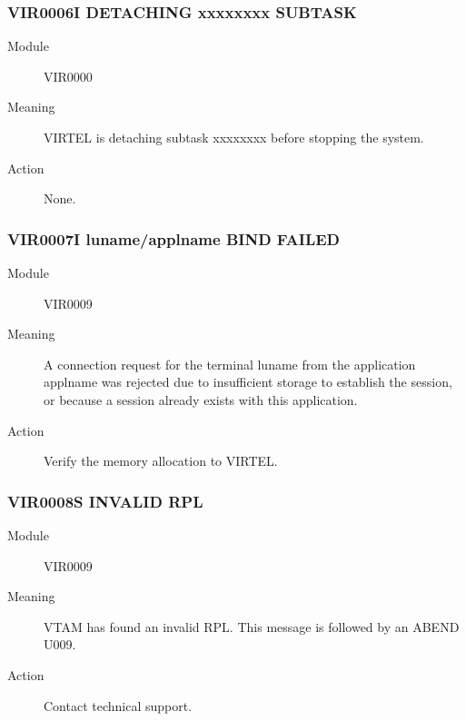 \documentclass[letterpaper,10pt,english]{sphinxmanual}
\begin{document}
\subsubsection{VIR0006I DETACHING xxxxxxxx SUBTASK}
\label{\detokenize{messages:vir0006i-detaching-xxxxxxxx-subtask}}\begin{description}
\item[{Module}] \leavevmode
VIR0000

\item[{Meaning}] \leavevmode
VIRTEL is detaching subtask xxxxxxxx before stopping the system.

\item[{Action}] \leavevmode
None.

\end{description}


\subsubsection{VIR0007I luname/applname BIND FAILED}
\label{\detokenize{messages:vir0007i-luname-applname-bind-failed}}\begin{description}
\item[{Module}] \leavevmode
VIR0009

\item[{Meaning}] \leavevmode
A connection request for the terminal luname from the application applname was rejected due to insufficient storage to establish the session, or because a session already exists with this application.

\item[{Action}] \leavevmode
Verify the memory allocation to VIRTEL.

\end{description}


\subsubsection{VIR0008S INVALID RPL}
\label{\detokenize{messages:vir0008s-invalid-rpl}}\begin{description}
\item[{Module}] \leavevmode
VIR0009

\item[{Meaning}] \leavevmode
VTAM has found an invalid RPL. This message is followed by an ABEND U009.

\item[{Action}] \leavevmode
Contact technical support.

\end{description}
\end{document}
